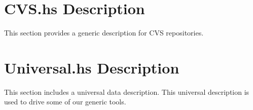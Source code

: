 

\newpage

\section{CVS.hs Description}

This section provides a generic description for CVS repositories.



\section{Universal.hs Description}

This section includes a universal data description.  This universal description
is used to drive some of our generic tools.







